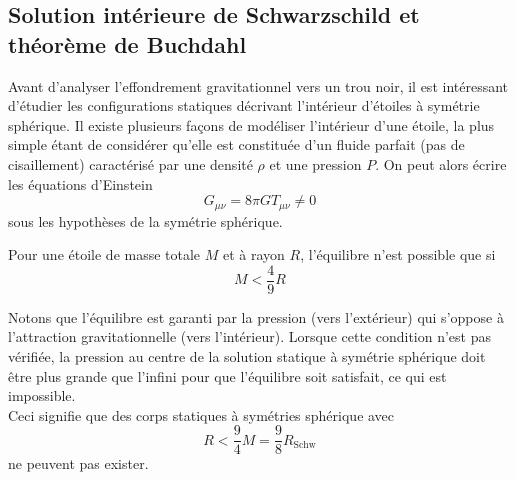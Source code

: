 \subsection{Solution intérieure de Schwarzschild et théorème de Buchdahl}
Avant d'analyser l'effondrement gravitationnel vers un trou noir, il est intéressant d'étudier les configurations statiques décrivant l'intérieur d'étoiles à symétrie sphérique. Il existe plusieurs façons de modéliser l'intérieur d'une étoile, la plus simple étant de considérer qu'elle est constituée d'un fluide parfait (pas de cisaillement) caractérisé par une densité $\rho$ et une pression $P$. On peut alors écrire les équations d'Einstein
\begin{equation}
    G_{\mu\nu} = 8 \pi G T_{\mu\nu} \neq 0
\end{equation}
sous les hypothèses de la symétrie sphérique.
\begin{theoremframe}
    \begin{theorem}[de Buchdahl (1959)]
        Pour une étoile de masse totale $M$ et à rayon $R$, l'équilibre n'est possible que si 
        \begin{equation}
            M < \frac{4}{9}R
        \end{equation}
    \end{theorem}
\end{theoremframe}
Notons que l'équilibre est garanti par la pression (vers l'extérieur) qui s'oppose à l'attraction gravitationnelle (vers l'intérieur). Lorsque cette condition n'est pas vérifiée, la pression au centre de la solution statique à symétrie sphérique doit être plus grande que l'infini pour que l'équilibre soit satisfait, ce qui est impossible. \\
Ceci signifie que des corps statiques à symétries sphérique avec
\begin{equation}
    R < \frac{9}{4} M = \frac{9}{8} R_\text{Schw}
\end{equation}
ne peuvent pas exister.
